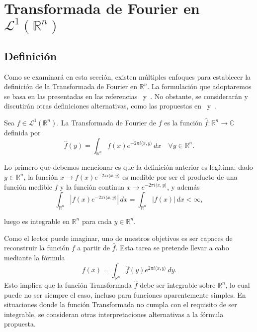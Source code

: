 
\chapter{Transformada de Fourier en $\mathscr{L}^1(\mathbb{R}^n)$}
\section{Definición}

Como se examinará en esta sección, existen múltiples enfoques para establecer la definición de la Transformada de Fourier en $\mathbb{R}^n$. La formulación que adoptaremos se basa en las presentadas en las referencias~\cite{FourierAnalysisApplications} y~\cite{FirstCourseFourier}. No obstante, se considerarán y discutirán otras definiciones alternativas, como las propuestas en~\cite{FourierTransformsClassic} y~\cite{Riviere2023Fourier}.

\begin{definicion}\label{def:definicion}
Sea $f \in \mathscr{L}^1(\mathbb{R}^n)$. La Transformada de Fourier de $f$ es  la función $\widehat{f} : \mathbb{R}^n \rightarrow \mathbb{C}$ definida por 
\begin{equation}
    \widehat{f}(y) = \int_{\mathbb{R}^n} f(x) e^{-2\pi i \langle x, y \rangle} \, dx \quad \forall y \in \mathbb{R}^n.
\end{equation}
\end{definicion}


\begin{observacion}
    Lo primero que debemos mencionar es que la definición anterior es legítima: dado $y \in \mathbb{R}^n$, la función $x \rightarrow f(x)e^{-2\pi i\langle x, y \rangle}$ es medible por ser el producto de una función medible $f$ y la función continua $x \rightarrow e^{-2 \pi i \langle x, y \rangle}$, y además 
    \begin{equation}
        \int_{\mathbb{R}^n}|f(x)e^{-2\pi i\langle x, y \rangle}| \, dx  = \int_{\mathbb{R}^n}|f(x)| \, dx < \infty,
    \end{equation}
\end{observacion}
\noindent luego es integrable en $\mathbb{R}^n$ para cada $y\in\mathbb{R}^n$.

\begin{observacion} \label{obs2}
Como el lector puede imaginar, uno de nuestros objetivos es ser capaces de reconstruir la función $f$ a partir de $\widehat{f}$. Esta tarea se pretende llevar a cabo mediante la fórmula 
\begin{equation}
    f(x) = \int_{\mathbb{R}^n} \widehat{f}(y) e^{2\pi i \langle x, y \rangle} \, dy .
\end{equation}
Esto implica que la función Transformada \( \widehat{f} \) debe ser integrable sobre \( \mathbb{R}^n \), lo cual puede no ser siempre el caso, incluso para funciones aparentemente simples. En situaciones donde la función Transformada no cumpla con el requisito de ser integrable, se consideran otras interpretaciones alternativas a la fórmula propuesta.
\end{observacion}


